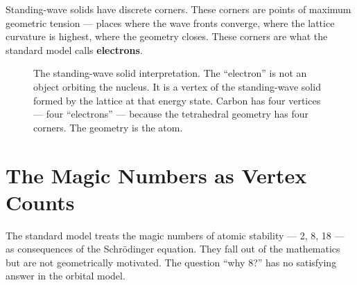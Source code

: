 \documentclass[11pt, letterpaper, openany]{book}
\begin{document}
Standing-wave solids have discrete corners. These corners are points
of maximum geometric tension — places where the wave fronts converge,
where the lattice curvature is highest, where the geometry closes.
These corners are what the standard model calls \textbf{electrons}.

\begin{figure}[H]
\centering
{}
\caption{The standing-wave solid interpretation. The ``electron'' is
not an object orbiting the nucleus. It is a vertex of the standing-wave
solid formed by the lattice at that energy state. Carbon has four
vertices — four ``electrons'' — because the tetrahedral geometry
has four corners. The geometry is the atom.}
\end{figure}

\section{The Magic Numbers as Vertex Counts}

The standard model treats the magic numbers of atomic stability —
2, 8, 18 — as consequences of the Schrödinger equation. They fall
out of the mathematics but are not geometrically motivated. The
question ``why 8?'' has no satisfying answer in the orbital model.
\end{document}
